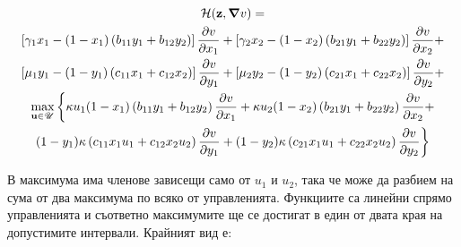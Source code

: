 \begin{multline}
  \label{eq:HamiltonianFull}
  \mathcal{H}(\mathbf{z}, \grad{v}) = \\
  \left[\gamma_1 x_1 - (1-x_1) \left(b_{11} y_1 + b_{12} y_2\right) \right] \pdv{v}{x_1} +
  \left[\gamma_2 x_2 - (1-x_2) \left(b_{21} y_1 + b_{22} y_2\right) \right] \pdv{v}{x_2} + \\
  \left[\mu_1 y_1 - (1-y_1) \left(c_{11} x_1 + c_{12} x_2\right) \right] \pdv{v}{y_1} +
  \left[\mu_2 y_2 - (1-y_2) \left(c_{21} x_1 + c_{22} x_2\right)\right] \pdv{v}{y_2} + \\
  \max_{\mathbf{u} \in \mathscr{U}} \bigg\{\kappa u_1(1-x_1) \left(b_{11} y_1 + b_{12} y_2\right) \pdv{v}{x_1} +
    \kappa u_2 (1-x_2) \left(b_{21} y_1 + b_{22} y_2\right) \pdv{v}{x_2} + \\
    (1-y_1) \kappa \left(c_{11} x_1 u_1 + c_{12} x_2 u_2 \right) \pdv{v}{y_1}+
  (1-y_2) \kappa \left(c_{21} x_1 u_1 + c_{22} x_2 u_2 \right) \pdv{v}{y_2}\bigg\}
\end{multline}

В максимума има членове зависещи само от $u_1$ и $u_2$, така че може да разбием на сума от два максимума по всяко от управленията.
Функциите са линейни спрямо управленията и съответно максимумите ще се достигат в един от двата края на допустимите интервали.
Крайният вид е:

